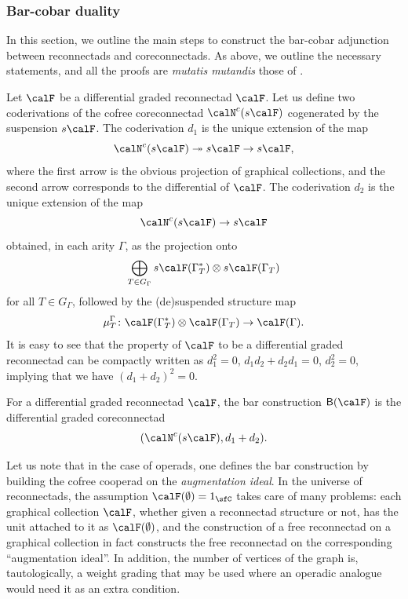 \subsubsection{Bar-cobar duality}

In this section, we outline the main steps to construct the bar-cobar adjunction between reconnectads and coreconnectads. As above, we outline the necessary statements, and all the proofs are \emph{mutatis mutandis} those of \cite[Sec.~6.5]{MR2954392}. 

Let $\calF$ be a differential graded reconnectad $\calF$. Let us define two coderivations of the cofree coreconnectad $\calN^c(s\calF)$ cogenerated by the suspension $s\calF$. The coderivation $d_1$ is the unique extension of the map
 \[
\calN^c(s\calF)\twoheadrightarrow s\calF\to s\calF,
 \]
where the first arrow is the obvious projection of graphical collections, and the second arrow corresponds to the differential of $\calF$. The coderivation $d_2$ is the unique extension of the map
 \[
\calN^c(s\calF)\to s\calF 
 \]
obtained, in each arity $\Gamma$, as the projection onto
 \[
\bigoplus_{T\in G_\Gamma}s\calF(\Gamma^*_T)\otimes s\calF(\Gamma_T)
 \]
for all $T\in G_\Gamma$, followed by the (de)suspended structure map 
 \[
\mu_T^\Gamma\colon \calF(\Gamma^*_T)\otimes \calF(\Gamma_T)\to \calF(\Gamma).
 \] 
It is easy to see that the property of $\calF$ to be a differential graded reconnectad can be compactly written as $d_1^2=0$, $d_1d_2+d_2d_1=0$, $d_2^2=0$, implying that we have $(d_1+d_2)^2=0$.

\begin{defi}
For a differential graded reconnectad $\calF$, the bar construction $\mathsf{B}(\calF)$ is the differential graded coreconnectad 
 \[
(\calN^c(s\calF),d_1+d_2).
 \]
\end{defi}

\begin{rema}
Let us note that in the case of operads, one defines the bar construction by building the cofree cooperad on the \emph{augmentation ideal}. 
In the universe of reconnectads, the assumption $\calF(\emptyset)=1_{\sfC}$ takes care of many problems: each graphical collection $\calF$, whether given a reconnectad structure or not, has the unit attached to it as $\calF(\emptyset)$, and the construction of a free reconnectad on a graphical collection in fact constructs the free reconnectad on the corresponding ``augmentation ideal''. In addition, the number of vertices of the graph is, tautologically, a weight grading that may be used where an operadic analogue would need it as an extra condition.  
\end{rema}

